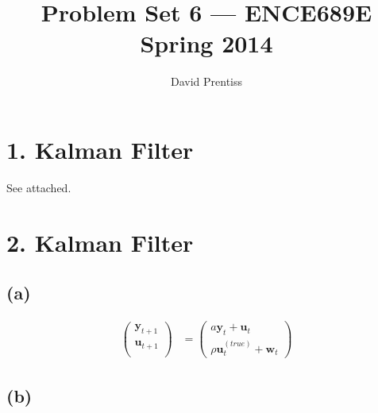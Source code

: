 \documentclass[fleqn, letterpaper]{tufte-handout}
\title{Problem Set 6 --- ENCE689E Spring 2014}
\author{David Prentiss}
\begin{document}
\maketitle

\section{1. Kalman Filter}
See attached.

\section{2. Kalman Filter}

{\scriptsize
        \begin{minipage}{\linewidth}
                
        \end{minipage}
}

\subsection{(a)}
\begin{align*}
\begin{pmatrix}
\mathbf{y}_{t+1} \\
\mathbf{u}_{t+1} \\
\end{pmatrix}
&=
\begin{pmatrix}
a\mathbf{y}_t + \mathbf{u}_t \\
\rho\mathbf{u}^{(true)}_t+ \mathbf{w}_t
\end{pmatrix}
\end{align*}

\subsection{(b)}
\end{document}
